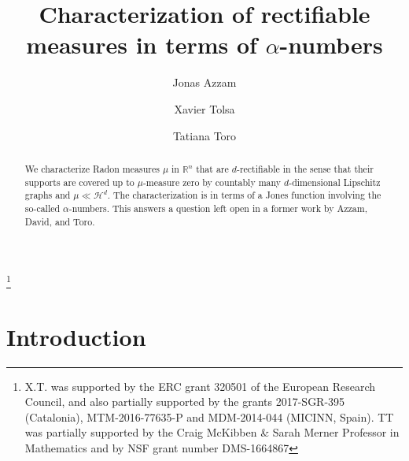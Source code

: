 \documentclass[11pt]{amsart}
\newcommand{\R}{{\mathbb R}}       %
\newcommand{\HH}{{\mathcal H}}
\theoremstyle{definition}
\theoremstyle{remark}
\numberwithin{equation}{section}
\def\gec{\gtrsim}
\def\lec{\lesssim}
\def\lec{\lesssim}
\def\Lip{\textrm{Lip}}
\begin{document}
	


\title[Characterization of 
rectifiable measures in terms of $\alpha$-numbers]{Characterization of 
rectifiable measures in terms of $\alpha$-numbers}

\author{Jonas Azzam}
\address{School of Mathematics, University of Edinburgh, JCMB, Kings Buildings,
	Mayfield Road, Edinburgh,
	EH9 3JZ, Scotland.}

\author{Xavier Tolsa}
\address{
ICREA, Passeig Llu\'{\i}s Companys 23 08010 Barcelona, Catalonia, and\\
Departament de Matem\`atiques and BGSMath
\\
Universitat Aut\`onoma de Barcelona
\\
08193 Bellaterra, Catalonia
}

\author{Tatiana Toro}
\address{University of Washington \\
	Department of Mathematics \\
	Seattle, WA 98195-4350, USA}

\thanks{X.T. was supported by the ERC grant 320501 of the European Research Council, and also partially supported by the grants 2017-SGR-395 (Catalonia), MTM-2016-77635-P and  MDM-2014-044 (MICINN, Spain). TT was partially supported by the Craig McKibben \& Sarah Merner Professor in Mathematics and by NSF grant number DMS-1664867}

\def\Lip{{\rm Lip}}
	\def\lec{\lesssim}
\def\gec{\gtrsim} 



\begin{abstract}
	We characterize Radon measures $\mu$ in $\R^{n}$ that are $d$-rectifiable in the sense that their supports are covered up to $\mu$-measure zero by countably many $d$-dimensional Lipschitz graphs and $\mu \ll \HH^{d}$. The characterization is in terms of a Jones function involving the so-called $\alpha$-numbers. This answers a question left open in a former work by Azzam, David, and Toro. 
\end{abstract}

\maketitle


\section{Introduction}
\end{document}
